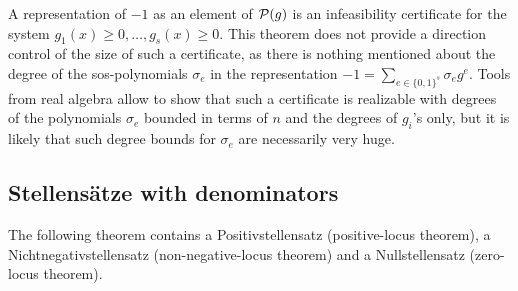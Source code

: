 \begin{remark}
	A representation of $-1$ as an element of $\mathcal{P}(g)$ is an infeasibility certificate for the system $g_1(x) \ge 0,\ldots,g_s(x) \ge 0$. This theorem does not provide a direction control of the size of such a certificate, as there is nothing mentioned about the degree of the sos-polynomials $\sigma_e$ in the representation $-1 = \sum_{e \in \{0,1\}^s} \sigma_e g^e$. Tools from real algebra allow to show that such a certificate is realizable with degrees of the polynomials $\sigma_e$ bounded in terms of $n$ and the degrees of $g_i$'s only, but it is likely that such degree bounds for $\sigma_e$ are necessarily very huge. 
\end{remark}


\subsection{Stellensätze with denominators}

The following theorem contains a Positivstellensatz (positive-locus theorem), a Nichtnegativstellensatz (non-negative-locus theorem) and a Nullstellensatz (zero-locus theorem). 

